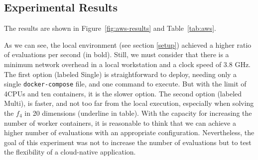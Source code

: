 \documentclass[review]{elsarticle}
\begin{document}
\subsection{Experimental Results} 


The results are shown in Figure~\ref{fig:aws-results} and Table~\ref{tab:aws}. 

As we can see, the local environment (see section \ref{setup}) achieved a higher
ratio of evaluations per second (in bold). Still, we must consider that there is a minimum
network overhead in a local workstation and a clock speed of 3.8 GHz. The first
option (labeled Single) is straightforward to deploy, needing only a single
{\tt docker-compose} file, and one command to execute. But with the limit of 4CPUs and
ten containers, it is the slower option. The second option (labeled Multi), is
faster, and not too far from the local execution, especially when solving the
$f_4$ in 20 dimensions (underline in table). With the capacity for increasing the number of worker
containers, it is reasonable to think that we can achieve a higher number of
evaluations with an appropriate configuration. Nevertheless, the goal of this
experiment was not to increase the number of evaluations but to test the
flexibility of a cloud-native application.
\end{document}
